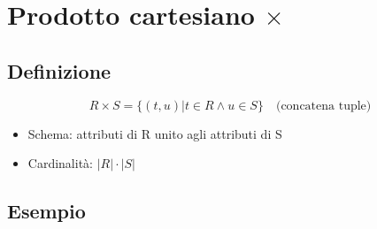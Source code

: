 \section{Prodotto cartesiano $\times$}
\subsection{Definizione}
$$
R \times S = \{(t,u)|t \in R \land u\in S\} \quad \text{(concatena tuple)}
$$
\begin{itemize}
    \item Schema: attributi di R unito agli attributi di S
    \item Cardinalità: $|R|\cdot|S|$ 
\end{itemize}

\subsection{Esempio}
